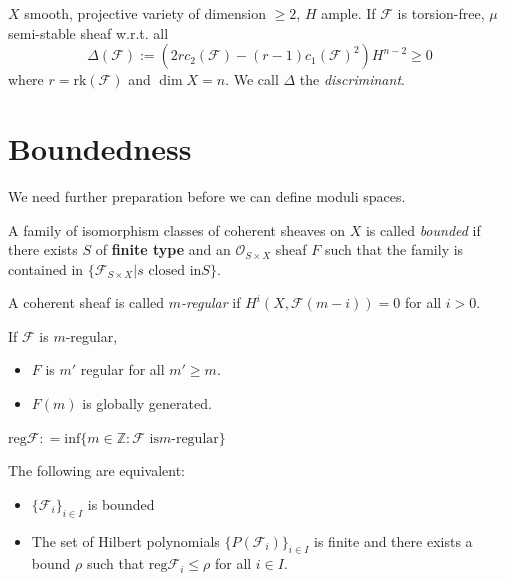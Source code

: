 \begin{theorem}
\label{theorem-Bogomolov-inequality}
$X$ smooth, projective variety of dimension
$\geq 2$, $H$ ample. If $\mathcal{F}$ is
torsion-free, $\mu$ semi-stable sheaf w.r.t.
all
$$
\Delta(\mathcal{F}):=(2rc_2(\mathcal{F})-
(r-1)c_1(\mathcal{F})^2)H^{n-2}\geq 0
$$
where $r=\text{rk}(\mathcal{F})$ and $\dim
X=n$. We call $\Delta$ the {\it
discriminant}.
\end{theorem}

\section{Boundedness}
\label{section-boundedness}

We need further preparation before we can
define moduli spaces.

\begin{definition}
\label{definition-bounded-family}
A family of isomorphism classes of coherent
sheaves on $X$ is called {\it bounded} if
there exists $S$ of {\bf finite type} and an
$\mathcal{O}_{S \times X}$ sheaf $F$ such
that the family is contained in $\{
\mathcal{F}_{S \times X}|s  \text{ closed in
}S\}$.
\end{definition}

\begin{definition}
\label{definition-m-regularity}
A coherent sheaf is called {\it $m$-regular}
if $H^{i}(X,\mathcal{F}(m-i))=0$ for all
$i>0$.
\end{definition}

\begin{proposition}
\label{proposition-m-regularity}
If $\mathcal{F}$ is $m$-regular,
\begin{itemize}
\item $F$ is $m'$ regular for all $m' \geq
m$.
\item $F(m)$ is globally generated.
\end{itemize}
\end{proposition}

\begin{definition}
\label{definition-regular-infimum}
$\text{reg}\mathcal{F}: =\text{inf}\{m \in
\mathbb{Z}:\mathcal{F}\text{ is
$m$-regular}\}$
\end{definition}

\begin{lemma}
\label{lemma-}
The following are equivalent:
\begin{itemize}
\item $\{\mathcal{F}_i\}_{i \in I}$ is
bounded
\item The set of Hilbert polynomials
$\{P(\mathcal{F}_i)\}_{i \in I}$ is finite
and there exists a bound $\rho$ such that
$\text{reg}\mathcal{F}_i\leq \rho$ for all $i
\in I$.
\end{itemize}
\end{lemma}

